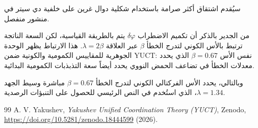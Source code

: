 \documentclass[11pt,a4paper]{article}
\theoremstyle{remark}
\begin{document}
	سيُقدم اشتقاق أكثر صرامة باستخدام شكلية دوال غرين على خلفية دي سيتر في منشور منفصل.
	
	من الجدير بالذكر أن تكميم الاضطراب $\delta\varphi$ يتم بالطريقة القياسية، لكن السعة الناتجة ترتبط بالأس الكوني لتدرج الخطأ $\beta$ عبر العلاقة $\lambda = 2\beta$. هذا الارتباط يظهر الوحدة الجوهرية للمقاييس الكمومية والكونية ضمن YUCT: نفس الأس $\beta = 0.67$ الذي يحدد معدلات الخطأ في تضاعف الحمض النووي يحدد أيضاً سعة التذبذبات الكمومية البدائية.
	
	وبالتالي، يحدد الأس الفركتالي الكوني لتدرج الخطأ $\beta = 0.67$ مباشرة وسيط الجهد $\lambda = 1.34$، الذي استُخدم في النص الرئيسي للحصول على التنبؤات الرصدية.
	
	\begin{thebibliography}{99}
		A. V. Yakushev, \emph{Yakushev Unified Coordination Theory (YUCT)}, Zenodo, \url{https://doi.org/10.5281/zenodo.18444599} (2026).
	\end{thebibliography}
	
\end{document}
